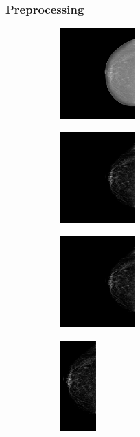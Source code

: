 \documentclass{beamer}
\begin{document}
	\begin{frame}
		\frametitle{Preprocessing}
		\begin{figure}
		\centering
			\begin{subfigure}{0.24\textwidth}
				\centering
					\includegraphics[height=3.5cm]{plots/mammogram.png}
			\end{subfigure}
			\begin{subfigure}{0.24\textwidth}
				\centering
					\includegraphics[height=3.5cm]{plots/mammogram_enhanced.png}
			\end{subfigure}
			\begin{subfigure}{0.24\textwidth}
				\centering
					\includegraphics[height=3.5cm]{plots/mammogram_resized.png}
			\end{subfigure}
			\begin{subfigure}{0.11\textwidth}
				\centering
					\includegraphics[height=3.5cm]{plots/mammogram_final.png}
			\end{subfigure}
			~
			\begin{subfigure}{0.24\textwidth}

\end{subfigure}
\end{figure}
\end{frame}
\end{document}
